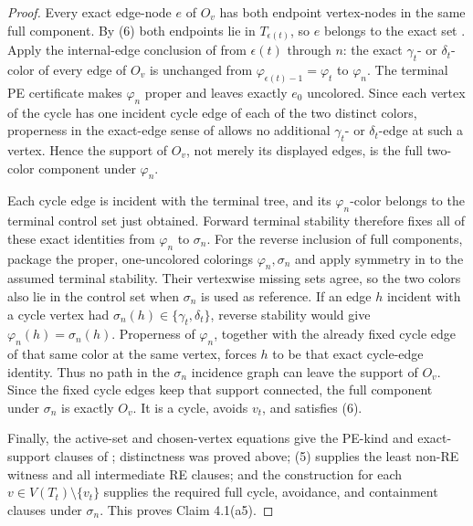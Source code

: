 \begin{proof}
Every exact edge-node \(e\) of \(O_v\) has both endpoint vertex-nodes in
the same full component.  By (6) both endpoints lie in
\(T_{\epsilon(t)}\), so \(e\) belongs to the exact set
.  Apply the internal-edge conclusion of
 from \(\epsilon(t)\) through \(n\):
the exact \(\gamma_t\)- or \(\delta_t\)-color of every edge of \(O_v\)
is unchanged from \(\varphi_{\epsilon(t)-1}=\varphi_t\) to
\(\varphi_n\).  The terminal PE certificate makes \(\varphi_n\) proper
and leaves exactly \(e_0\) uncolored.  Since each vertex of the cycle has
one incident cycle edge of each of the two distinct colors, properness
in the exact-edge sense of  allows no
additional \(\gamma_t\)- or \(\delta_t\)-edge at such a vertex.  Hence
the support of \(O_v\), not merely its displayed edges, is the full
two-color component under \(\varphi_n\).

Each cycle edge is incident with the terminal tree, and its
\(\varphi_n\)-color belongs to the terminal control set just obtained.
Forward terminal stability  therefore fixes all
of these exact identities from \(\varphi_n\) to \(\sigma_n\).  For the
reverse inclusion of full components, package the proper, one-uncolored
colorings \(\varphi_n,\sigma_n\) and apply symmetry in  to
the assumed terminal stability.  Their vertexwise missing sets agree, so
the two colors also lie in the control set when \(\sigma_n\) is used as
reference.  If an edge \(h\) incident with a cycle vertex had
\(\sigma_n(h)\in\{\gamma_t,\delta_t\}\), reverse stability would give
\(\varphi_n(h)=\sigma_n(h)\).  Properness of \(\varphi_n\), together
with the already fixed cycle edge of that same color at the same vertex,
forces \(h\) to be that exact cycle-edge identity.  Thus no path in the
\(\sigma_n\) incidence graph can leave the support of \(O_v\).  Since
the fixed cycle edges keep that support connected, the full component
under \(\sigma_n\) is exactly \(O_v\).  It is a cycle, avoids \(v_t\),
and satisfies (6).

Finally, the active-set and chosen-vertex equations give the PE-kind and
exact-support clauses of ; distinctness
was proved above; (5) supplies the least non-RE witness and all
intermediate RE clauses; and the construction for each
\(v\in V(T_t)\setminus\{v_t\}\) supplies the required full cycle,
avoidance, and containment clauses under \(\sigma_n\).  This proves
Claim 4.1(a5).
\end{proof}
